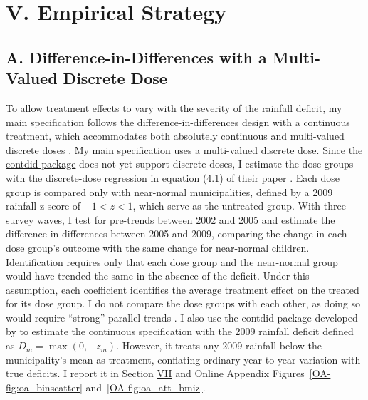 \documentclass[12pt]{article}
\begin{document}
\section*{V. Empirical Strategy}\label{sec:V}

\subsection*{A. Difference-in-Differences with a Multi-Valued Discrete Dose}

To allow treatment effects to vary with the severity of the rainfall deficit, my main specification follows the difference-in-differences design with a continuous treatment, which accommodates both absolutely continuous and multi-valued discrete doses \parencite{callawayDifferenceinDifferencesContinuousTreatment2024}. My main specification uses a multi-valued discrete dose. Since the \href{https://bcallaway11.github.io/contdid/}{contdid package} does not yet support discrete doses, I estimate the dose groups with the discrete-dose regression in equation (4.1) of their paper \parencite{callawayDifferenceinDifferencesContinuousTreatment2024}. Each dose group is compared only with near-normal municipalities, defined by a 2009 rainfall z-score of $-1 < z < 1$, which serve as the untreated group. With three survey waves, I test for pre-trends between 2002 and 2005 and estimate the difference-in-differences between 2005 and 2009, comparing the change in each dose group's outcome with the same change for near-normal children. Identification requires only that each dose group and the near-normal group would have trended the same in the absence of the deficit. Under this assumption, each coefficient identifies the average treatment effect on the treated for its dose group. I do not compare the dose groups with each other, as doing so would require ``strong'' parallel trends \parencite{callawayDifferenceinDifferencesContinuousTreatment2024}. I also use the contdid package developed by \textcite{callawayDifferenceinDifferencesContinuousTreatment2026} to estimate the continuous specification with the 2009 rainfall deficit defined as $D_m = \max(0, -z_m)$. However, it treats any 2009 rainfall below the municipality's mean as treatment, conflating ordinary year-to-year variation with true deficits. I report it in Section \hyperref[sec:VII]{VII} and Online Appendix Figures~\ref{OA-fig:oa_binscatter} and~\ref{OA-fig:oa_att_bmiz}.
\end{document}
